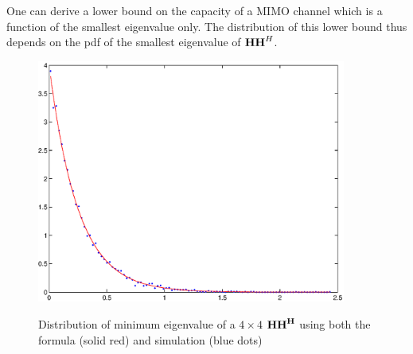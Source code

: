 \documentclass[12pt]{article}
\begin{document}
One can derive a lower bound on the capacity of a MIMO channel
which is a function of the smallest eigenvalue only.  The
distribution of this lower bound thus depends on the pdf of the
smallest eigenvalue of ${\bf HH}^H$.

\begin{figure}[h]
  \centering
  \includegraphics[width=4.0in]{min_eigenvalue.eps}\\
  \caption{Distribution of minimum eigenvalue of a $4\times 4$ $\bf{HH}^H$
  using both the formula (solid red) and simulation (blue dots)}\label{fig:min_eig}
\end{figure}
\end{document}
